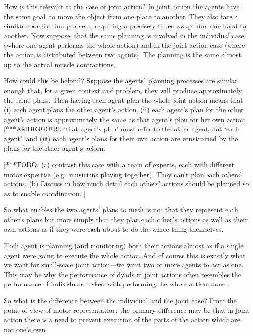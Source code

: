 \documentclass[12pt,\papersize]{extarticle}
\begin{document}
How is this relevant to the case of joint action?
In joint action the agents have the same goal, to move the object from one place to another.
They also face a similar coordination problem, requiring a precisely timed swap from one hand to another.
Now suppose, that the same planning is involved in the individual case (where one agent performs the whole action) and in the joint action case (where the action is distributed between two agents).
The planning is the same almost up to the actual muscle contractions.

How could this be helpful?
Suppose the agents' planning processes are similar enough that, for a given context and problem, they will produce approximately the same plans.
Then having each agent plan the whole joint action means that (i) each agent plans the other agent's action,
(ii) each agent's plan for the other agent's action is approximately the same as that agent's plan for her own action [***AMBIGUOUS: `that agent's plan' must refer to the other agent, not `each agent',
and 
(iii) each  agent's plans for their own action are constrained by the plans for the other agent's action.

[***TODO: (a) contrast this case with a team of experts, each with different motor expertise (e.g.\ musicians playing together).  
They can't plan each others' actions.
(b) Discuss in how much detail each others' actions should be planned so as to enable coordination.
]


So what enables the two agents' plans to mesh is not that they represent each other's plans but more simply that they plan each other's actions as well as their own actions as if they were each about to do the whole thing themselves.

Each agent is planning (and monitoring) both their actions almost as if a single agent were going to execute the whole action.
And of course this is exactly what we want for small-scale joint action---we want two or more agents to act as one.
This may be why the performance of dyads in joint actions often resembles the performance of individuals tasked with performing the whole action alone \citep{Knoblich:2003nf}.

So what is the difference between the individual and the joint case?  From the point of view of motor representation, the primary difference may be that in joint action there is a need to prevent execution of the parts of the action which are not one’s own.

\end{document}
